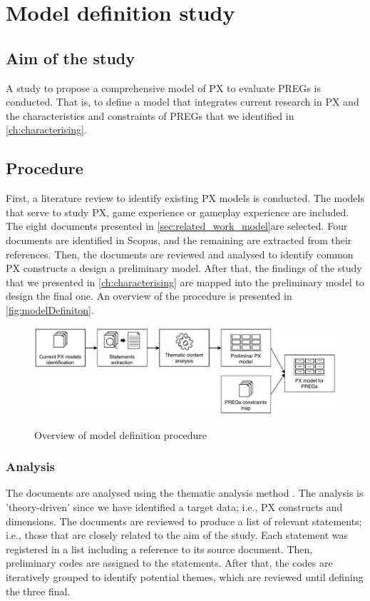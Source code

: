 \section{Model definition study} %
\label{sec:mats_mets_model}
\subsection{Aim of the study}
A study to propose a comprehensive model of \ac{PX} to evaluate \acp{PREG} is conducted. That is, to define a model that integrates current research in \ac{PX} and the characteristics and constraints of \acp{PREG} that we identified in \autoref{ch:characterising}.

\subsection{Procedure}
First, a literature review to identify existing \ac{PX} models is conducted. The models that serve to study \ac{PX}, game experience or gameplay experience are included. The eight documents presented in \autoref{sec:related_work_model}are selected. Four documents are identified in Scopus, and the remaining are extracted from their references. Then, the documents are reviewed and analysed to identify common \ac{PX} constructs a design a preliminary model. After that, the findings of the study that we presented in \autoref{ch:characterising} are mapped into the preliminary model to design the final one. An overview of the procedure is presented in \autoref{fig:modelDefiniton}.

\begin{figure}[bth]
\myfloatalign
{\includegraphics[width=\linewidth]{gfx/model/modelDefiniton}} \quad
\caption{Overview of model definition procedure}\label{fig:modelDefiniton}
\end{figure}

\subsubsection{Analysis}
The documents are analysed using the thematic analysis method \autocite{Braun}. The analysis is 'theory-driven' since we have identified a target data; i.e., \ac{PX} constructs and dimensions. The documents are reviewed to produce a list of relevant statements; i.e., those that are closely related to the aim of the study. Each statement was registered in a list including a reference to its source document. Then, preliminary codes are assigned to the statements. After that, the codes are iteratively grouped to identify potential themes, which are reviewed until defining the three final.

